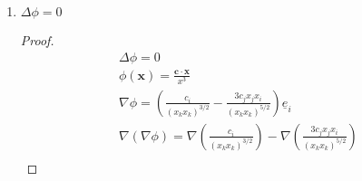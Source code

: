 \begin{enumerate}
\begin{enumerate}
\begin{proof}
Taking the partial derivative of Eqn (\ref{eq:65}) using the product rule for the second term:

\begin{align}
 -\frac{3}{2} \epsilon_{lnm}\epsilon_{ijk}c_{j}x_{k}(x_{s}x_{s})^{-5/2}(2\delta_{sn}x_{s})\delta_{im}e_{l} \\
=-\frac{3}{2}\epsilon_{lni}\epsilon_{ijk}c_{j}x_{k}(x_{s}x_{s})^{-5/2}2x_{n}e_{l} \\
=-3\epsilon_{lni}\epsilon_{jki}c_{j}x_{k}x_{n}(x_{s}x_{s})^{-5/2}\underline{e}_{l} \\
(\delta_{lj}\delta_{nk}-\delta_{lk}\delta_{nj})(-3c_{j}x_{k}x_{n}(x_{s}x_{s})^{-5/2})\underline{e}_{l} \\
=\delta_{lj}\delta_{nk}(-3c_{j}x_{k}x_{n}(x_{s}x_{s})^{-5/2})\underline{e}_{l}-\delta_{lk}\delta_{nj}(-3c_{j}x_{k}x_{n}(x_{s}x_{s})^{-5/2})\underline{e}_{l} \\
=-3c_{l}x_{k}x_{k}(x_{s}x_{s})^{-5/2}e_{l}+3c_{n}x_{l}x_{n}(x_{s}x_{s})^{-5/2}\underline{e}_{l} \\
=-\frac{3c_{l}}{(x_{s}x_{s})^{3/2}}+\frac{3c_{n}x_{n}x_{l}}{(x_{s}x_{s})^{5/2}}+\frac{2c_{l}}{(x_{s}x_{s})^{3/2}} \\
=-\frac{c_{l}}{(x_{s}x_{s})^{3/2}}+\frac{3c_{n}x_{n}x_{l}}{(x_{s}x_{s})^{5/2}} \label{eq:78}
\end{align}
Adding Eqns (\ref{eq:62}) and (\ref{eq:78}) together:
\begin{align}
    \nabla \phi+\text{curl}(\mathbf{v})=\mathbf{0} \\
    =
    \frac{c_{i}}{(x_{k}x_{k})^{3/2}}\underline{e}_{i}-\frac{3c_{j}x_{j}x_{i}}{(x_{k}x_{k})^{5/2}}\underline{e}_{i}-\frac{c_{l}}{(x_{s}x_{s})^{3/2}}\underline{e}_{l}+\frac{3c_{n}x_{n}x_{l}}{(x_{s}x_{s})^{5/2}}\underline{e}_{l} \\
    =0
    \end{align}
            \end{proof}
\pagebreak
            \item $\Delta \phi=0$
            \begin{proof}
                \begin{align}
                    \Delta \phi=0 \\
                    \phi(\mathbf{x})=\frac{\mathbf{c}\cdot \mathbf{x}}{x^3} \\
                    \nabla \phi=\left( \frac{c_{i}}{(x_{k}x_{k})^{3/2}}-\frac{3c_{j}x_{j}x_{i}}{(x_{k}x_{k})^{5/2}} \right)\underline{e}_{i} \\
                    \nabla(\nabla \phi)=\nabla\left( \frac{c_{i}}{(x_{k}x_{k})^{3/2}}\right)-\nabla\left( \frac{3c_{j}x_{j}x_{i}}{(x_{k}x_{k})^{5/2}}  \right) \\

\end{align}
\end{proof}
\end{enumerate}
\end{enumerate}
